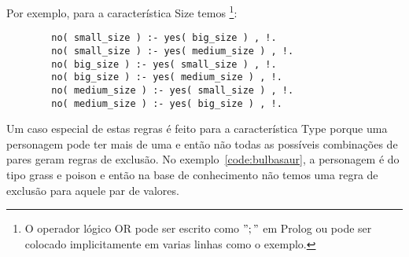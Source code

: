 Por exemplo, para a característica Size temos \footnote{O operador lógico OR pode ser escrito como $";"$ em Prolog ou pode ser colocado implicitamente em varias linhas como o exemplo.}:
	\begin{lstlisting}
		no( small_size ) :- yes( big_size ) , !.
		no( small_size ) :- yes( medium_size ) , !.
		no( big_size ) :- yes( small_size ) , !.
		no( big_size ) :- yes( medium_size ) , !.
		no( medium_size ) :- yes( small_size ) , !.
		no( medium_size ) :- yes( big_size ) , !.
	\end{lstlisting}

Um caso especial de estas regras é feito para a característica Type porque uma personagem pode ter mais de uma e então não todas as possíveis combinações de pares geram regras de exclusão. No exemplo~\ref{code:bulbasaur}, a personagem é do tipo grass e poison e então na base de conhecimento não temos uma regra de exclusão para aquele par de valores.